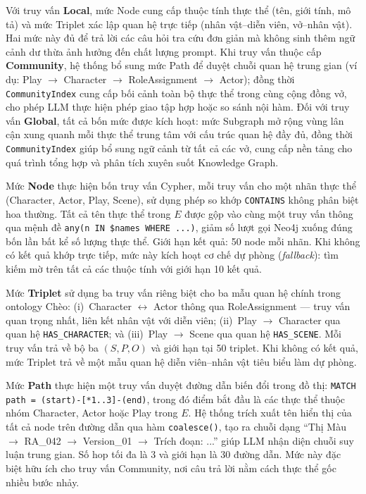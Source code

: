 Với truy vấn \textbf{Local}, mức Node cung cấp thuộc tính thực thể (tên, giới tính, mô tả) và mức Triplet xác lập quan hệ trực tiếp (nhân vật--diễn viên, vở--nhân vật). Hai mức này đủ để trả lời các câu hỏi tra cứu đơn giản mà không sinh thêm ngữ cảnh dư thừa ảnh hưởng đến chất lượng prompt. Khi truy vấn thuộc cấp \textbf{Community}, hệ thống bổ sung mức Path để duyệt chuỗi quan hệ trung gian (ví dụ: Play $\rightarrow$ Character $\rightarrow$ RoleAssignment $\rightarrow$ Actor); đồng thời \texttt{CommunityIndex} cung cấp bối cảnh toàn bộ thực thể trong cùng cộng đồng vở, cho phép LLM thực hiện phép giao tập hợp hoặc so sánh nội hàm. Đối với truy vấn \textbf{Global}, tất cả bốn mức được kích hoạt: mức Subgraph mở rộng vùng lân cận xung quanh mỗi thực thể trung tâm với cấu trúc quan hệ đầy đủ, đồng thời \texttt{CommunityIndex} giúp bổ sung ngữ cảnh từ tất cả các vở, cung cấp nền tảng cho quá trình tổng hợp và phân tích xuyên suốt Knowledge Graph.

Mức \textbf{Node} thực hiện bốn truy vấn Cypher, mỗi truy vấn cho một nhãn thực thể (Character, Actor, Play, Scene), sử dụng phép so khớp \texttt{CONTAINS} không phân biệt hoa thường. Tất cả tên thực thể trong $E$ được gộp vào cùng một truy vấn thông qua mệnh đề \texttt{any(n IN \$names WHERE ...)}, giảm số lượt gọi Neo4j xuống đúng bốn lần bất kể số lượng thực thể. Giới hạn kết quả: 50 node mỗi nhãn. Khi không có kết quả khớp trực tiếp, mức này kích hoạt cơ chế dự phòng (\textit{fallback}): tìm kiếm mờ trên tất cả các thuộc tính với giới hạn 10 kết quả.

Mức \textbf{Triplet} sử dụng ba truy vấn riêng biệt cho ba mẫu quan hệ chính trong ontology Chèo: (i)~Character $\leftrightarrow$ Actor thông qua RoleAssignment --- truy vấn quan trọng nhất, liên kết nhân vật với diễn viên; (ii)~Play $\rightarrow$ Character qua quan hệ \texttt{HAS\_CHARACTER}; và (iii)~Play $\rightarrow$ Scene qua quan hệ \texttt{HAS\_SCENE}. Mỗi truy vấn trả về bộ ba $(S, P, O)$ và giới hạn tại 50 triplet. Khi không có kết quả, mức Triplet trả về một mẫu quan hệ diễn viên--nhân vật tiêu biểu làm dự phòng.

Mức \textbf{Path} thực hiện một truy vấn duyệt đường dẫn biến đổi trong đồ thị: \texttt{MATCH path = (start)-[*1..3]-(end)}, trong đó điểm bắt đầu là các thực thể thuộc nhóm Character, Actor hoặc Play trong $E$. Hệ thống trích xuất tên hiển thị của tất cả node trên đường dẫn qua hàm \texttt{coalesce()}, tạo ra chuỗi dạng ``Thị Màu $\rightarrow$ RA\_042 $\rightarrow$ Version\_01 $\rightarrow$ Trích đoạn: ...'' giúp LLM nhận diện chuỗi suy luận trung gian. Số hop tối đa là 3 và giới hạn là 30 đường dẫn. Mức này đặc biệt hữu ích cho truy vấn Community, nơi câu trả lời nằm cách thực thể gốc nhiều bước nhảy.

